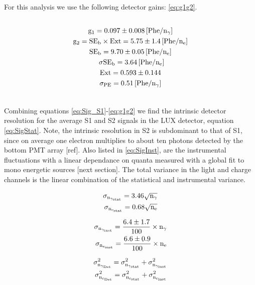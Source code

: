 For this analysis we use the following detector gains: \ref{eq:g1g2}. 
\begin{multline} \\
\rm g_1 = 0.097 \pm 0.008 \,[Phe/n_\gamma]\\
\rm g_2=SE_{b} \times Ext = 5.75 \pm 1.4 \,[Phe/n_e]\\
\rm SE_{b} = 9.70 \pm 0.05  \,[Phe/n_e] \\\ 
\rm \sigma SE_b = 3.64\, [Phe/n_e]\\
\rm Ext = 0.593\pm 0.144 \\
\rm \sigma_{PE} = 0.51\, [Phe/n_\gamma]\\\
\label{eq:g1g2}
\end{multline}

Combining equations \ref{eq:Sig_S1}-\ref{eq:g1g2} we find the intrinsic detector resolution for the average S1 and S2 signals in the LUX detector, equation \ref{eq:SigStat}. Note, the intrinsic resolution in S2 is subdominant to that of S1, since  on average one electron multiplies to about ten photons detected by the bottom PMT array [ref]. Also listed in \ref{eq:SigInst}, are the instrumental fluctuations with a linear dependance on quanta measured with a global fit to mono energetic sources [next section]. The total variance in the light and charge channels is the linear combination of the statistical and instrumental variance.  

\begin{equation}
\begin{split}
\rm  \sigma_{n_{\gamma_{stat}}} = 3.46 \sqrt{n_\gamma}\\
\rm \sigma_{n_{e_{stat}}} = 0.68 \sqrt{n_e}
\label{eq:SigStat}
\end{split}
\end{equation}

\begin{equation}
\begin{split}
\rm  \sigma_{n_{\gamma_{inst}}} = \frac{6.4\pm 1.7}{100} \times n_\gamma\\
\rm  \sigma_{n_{e_{inst}}} = \frac{6.6\pm 0.9}{100} \times n_e
\label{eq:SigInst}
\end{split}
\end{equation}

\begin{equation}
\begin{split}
\rm  \sigma_{n_{\gamma_{Det}}}^2 = \sigma_{n_{\gamma_{stat}}}^2 + \sigma_{n_{\gamma_{inst}}}^2 \\
\rm \sigma_{n_{e_{Det}}}^2 = \sigma_{n_{e_{stat}}}^2 + \sigma_{n_{e_{inst}}}^2
\label{eq:SigDet}
\end{split}
\end{equation}



